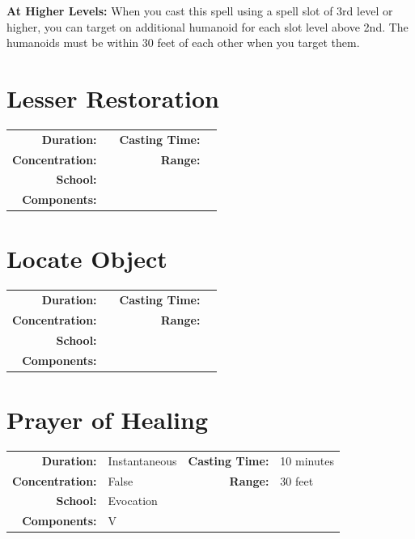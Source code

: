 \documentclass[12pt,showtrims]{memoir}
\begin{document}
\vspace{8pt} \noindent\textbf{At Higher Levels:} When you cast this spell using a spell slot of 3rd level or higher, you can target on additional humanoid for each slot level above 2nd. The humanoids must be within 30 feet of each other when you target them.



\newpage




\section*{Lesser Restoration}
{
\small\centering\vspace{-6pt}
\begin{tabular}{rlrl}
\toprule

\textbf{Duration:} &  &
\textbf{Casting Time:} &  \\
\textbf{Concentration:} & &
\textbf{Range:} &  \\
\textbf{School:} &  \\
\textbf{Components:} & \multicolumn{3}{p{0.7\textwidth}}{}\\

\bottomrule
\end{tabular}
}
\newpage
\section*{Locate Object}
{
\small\centering\vspace{-6pt}
\begin{tabular}{rlrl}
\toprule

\textbf{Duration:} &  &
\textbf{Casting Time:} &  \\
\textbf{Concentration:} & &
\textbf{Range:} &  \\
\textbf{School:} &  \\
\textbf{Components:} & \multicolumn{3}{p{0.7\textwidth}}{}\\

\bottomrule
\end{tabular}
}
\newpage
\section*{Prayer of Healing}

{
\small\centering\vspace{-6pt}
\begin{tabular}{rlrl}
\toprule

\textbf{Duration:} & Instantaneous &
\textbf{Casting Time:} & 10 minutes \\
\textbf{Concentration:} & False &
\textbf{Range:} & 30 feet \\
\textbf{School:} & Evocation \\
\textbf{Components:} & \multicolumn{3}{p{0.7\textwidth}}{V}\\

\bottomrule
\end{tabular}
}
\end{document}
